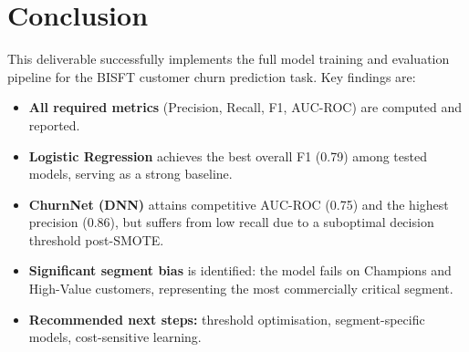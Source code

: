 \documentclass[12pt, a4paper]{article}
\begin{document}
\section{Conclusion}

This deliverable successfully implements the full model training and evaluation pipeline for the BISFT customer churn prediction task. Key findings are:

\begin{itemize}[noitemsep]
  \item \textbf{All required metrics} (Precision, Recall, F1, AUC-ROC) are computed and reported.
  \item \textbf{Logistic Regression} achieves the best overall F1 (0.79) among tested models, serving as a strong baseline.
  \item \textbf{ChurnNet (DNN)} attains competitive AUC-ROC (0.75) and the highest precision (0.86), but suffers from low recall due to a suboptimal decision threshold post-SMOTE.
  \item \textbf{Significant segment bias} is identified: the model fails on Champions and High-Value customers, representing the most commercially critical segment.
  \item \textbf{Recommended next steps:} threshold optimisation, segment-specific models, cost-sensitive learning.
\end{itemize}

\end{document}
